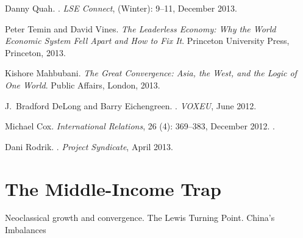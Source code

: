 \documentclass[%
 11pt%
]{article}
\begin{document}
Danny Quah.
.
\newblock \emph{LSE Connect},  (Winter): 9--11, December
  2013.%
\medskip

Peter Temin and David Vines.
\newblock \emph{{The Leaderless Economy: Why the World Economic System Fell
  Apart and How to Fix It}}.
\newblock Princeton University Press, Princeton, 2013.
\medskip

Kishore Mahbubani.
\newblock \emph{{The Great Convergence: Asia, the West, and the Logic of One
  World}}.
\newblock Public Affairs, London, 2013.
\medskip

J.~Bradford DeLong and Barry Eichengreen.
.
\newblock \emph{VOXEU}, June 2012.
\medskip

Michael Cox.
\newblock \emph{International Relations}, 26 (4): 369--383,
  December 2012.
.
\medskip

Dani Rodrik.
.
\newblock \emph{Project Syndicate}, April 2013.
\medskip

\section{The Middle-Income Trap}

Neoclassical growth and convergence.
The Lewis Turning Point.
China's Imbalances

\nocite{Eichengreen-B-Park-D-Shin-K-Growth-Slowdowns-Redux-2013}
\nocite{Aiyar-Shekhar-Growth-Slowdowns-Middle-Income-Trap-2013}
\nocite{Kharas-H-Kohli-H-What-is-the-Middle-Income-Trap-2011}
\nocite{Quah-D-Is-Chinas-Economy-Crashing-BOAO-2013}
\nocite{WorldBank-China-2030-2012}
\nocite{Storesletten-K+Zilibotti-Z-Chinas-Great-Convergence-2013}
\end{document}
